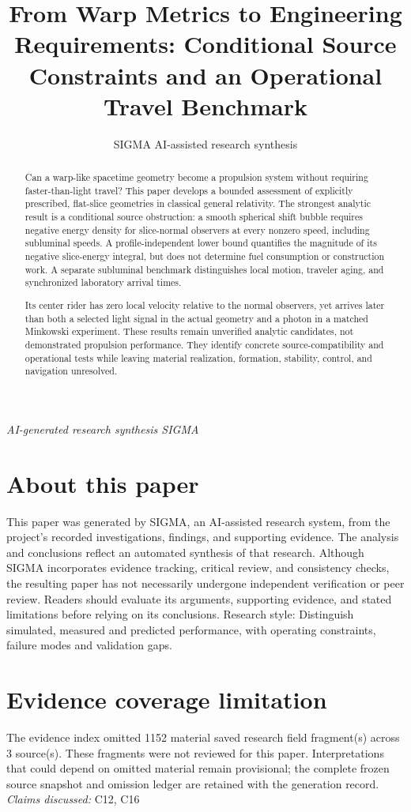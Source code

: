 \documentclass[11pt]{article}
\title{From Warp Metrics to Engineering Requirements: Conditional Source Constraints and an Operational Travel Benchmark}
\date{}
\author{SIGMA AI-assisted research synthesis}
\begin{document}
\maketitle
\begin{center}\small\textit{AI-generated research synthesis \textperiodcentered{} SIGMA}\end{center}

\begin{abstract}
Can a warp-like spacetime geometry become a propulsion system without requiring faster-than-light travel? This paper develops a bounded assessment of explicitly prescribed, flat-slice geometries in classical general relativity. The strongest analytic result is a conditional source obstruction: a smooth spherical shift bubble requires negative energy density for slice-normal observers at every nonzero speed, including subluminal speeds. A profile-independent lower bound quantifies the magnitude of its negative slice-energy integral, but does not determine fuel consumption or construction work. A separate subluminal benchmark distinguishes local motion, traveler aging, and synchronized laboratory arrival times.

Its center rider has zero local velocity relative to the normal observers, yet arrives later than both a selected light signal in the actual geometry and a photon in a matched Minkowski experiment. These results remain unverified analytic candidates, not demonstrated propulsion performance. They identify concrete source-compatibility and operational tests while leaving material realization, formation, stability, control, and navigation unresolved.
\end{abstract}
\section*{About this paper}
This paper was generated by SIGMA, an AI-assisted research system, from the project's recorded investigations, findings, and supporting evidence.
The analysis and conclusions reflect an automated synthesis of that research. Although SIGMA incorporates evidence tracking, critical review, and consistency checks, the resulting paper has not necessarily undergone independent verification or peer review.
Readers should evaluate its arguments, supporting evidence, and stated limitations before relying on its conclusions.
Research style: Distinguish simulated, measured and predicted performance, with operating constraints, failure modes and validation gaps.
\section*{Evidence coverage limitation}
The evidence index omitted 1152 material saved research field fragment(s) across 3 source(s). These fragments were not reviewed for this paper. Interpretations that could depend on omitted material remain provisional; the complete frozen source snapshot and omission ledger are retained with the generation record.
\textit{Claims discussed: }C12, C16
\end{document}
